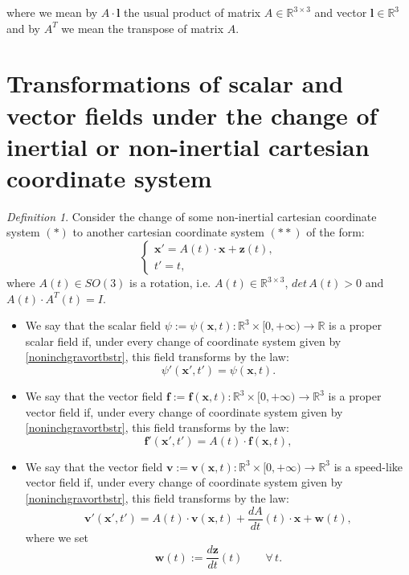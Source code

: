 \documentclass{article}
\theoremstyle{definition}
\newtheorem{definition}{Definition}[section]
\theoremstyle{remark}
\renewcommand{\vec}[1]{\mathbf{#1}}
\newcommand{\R}{\mathbb{R}}
\newcommand{\er}{\eqref}
\newcommand{\R}{{\mathbb{R}}}
\newcommand{\er}{\eqref}
\newtheorem{definition}{Definition}
\begin{document}
where
we mean by $A\cdot \vec l$  the usual product of matrix
$A\in\R^{3\times 3}$ and vector $\vec l\in\R^3$ and by $A^T$ we mean
the transpose of matrix $A$.
%





\section{Transformations of scalar and vector fields under the change of inertial or non-inertial cartesian coordinate
system}\label{fhfgfghdfdfdfd}
\begin{definition}\label{bggghghgj}
Consider the change of some non-inertial cartesian coordinate system
$(*)$ to another cartesian coordinate system $(**)$ of the form:
\begin{equation}\label{noninchgravortbstr}
\begin{cases}
\vec x'=A(t)\cdot\vec x+\vec z(t),\\
t'=t,
\end{cases}
\end{equation}
where $A(t)\in SO(3)$ is a rotation, i.e. $A(t)\in \R^{3\times 3}$,
$det\, A(t)>0$ and $A(t)\cdot A^T(t)=I$.
\begin{itemize}
\item
We say that the scalar field $\psi:=\psi(\vec
x,t):\R^3\times[0,+\infty)\to\R$ is a proper scalar field if, under
every change of coordinate system given by \er{noninchgravortbstr},
this field transforms by the law:
\begin{equation}\label{uguyytfdddd}
\psi'(\vec x',t')=\psi(\vec x,t).
\end{equation}

\item
We say that the vector field $\vec f:=\vec f(\vec
x,t):\R^3\times[0,+\infty)\to\R^3$ is a proper vector field if,
under every change of coordinate system given by
\er{noninchgravortbstr}, this field transforms by the law:
\begin{equation}\label{uguyytfddddgghjjg}
\vec f'(\vec x',t')=A(t)\cdot\vec f(\vec x,t),
\end{equation}


\item
We say that the vector field $\vec v:=\vec v(\vec
x,t):\R^3\times[0,+\infty)\to\R^3$ is a speed-like vector field if,
under every change of coordinate system given by
\er{noninchgravortbstr}, this field transforms by the law:
\begin{equation}
\label{NoIn5redbstr}\vec v'(\vec x',t')=A(t)\cdot \vec v(\vec x,t)+
\frac{d A}{dt}(t)\cdot\vec x+
\vec w(t),
\end{equation}
where we set
\begin{equation}\label{buitguihjk}
\vec w(t):=\frac{d\vec z}{dt}(t)\quad\quad\forall\,t.
\end{equation}


\end{itemize}
\end{definition}
\end{document}
